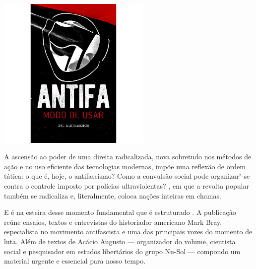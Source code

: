 \pagebreak %

\begin{center}
\hspace*{.5cm}\includegraphics[width=74mm]{./grid/antifa.png}
\end{center}

\hspace*{-7cm}\hrulefill\hspace*{-7cm}

\medskip

\noindent{}A ascensão ao poder de uma direita radicalizada, nova sobretudo nos métodos de ação e no uso eficiente das tecnologias modernas, impõe uma reflexão de ordem tática: o que é, hoje, o antifascismo? Como a convulsão social pode organizar"-se contra o controle imposto por polícias ultraviolentas?
, em que a revolta popular também se radicaliza e, literalmente, coloca nações inteiras em chamas.

E é na esteira desse momento fundamental que é estruturado {}. A publicação reúne ensaios, textos e entrevistas do historiador americano Mark Bray, especialista no movimento antifascista e uma das principais vozes do momento de luta. Além de textos de Acácio Augusto --- organizador do volume, cientista social e pesquisador em estudos libertários do grupo Nu-Sol --- compondo um material urgente e essencial para nosso tempo.

\vfill

\hspace*{-.4cm}\begin{minipage}[c]{.5\linewidth}
\small{
{}}
\end{minipage}

